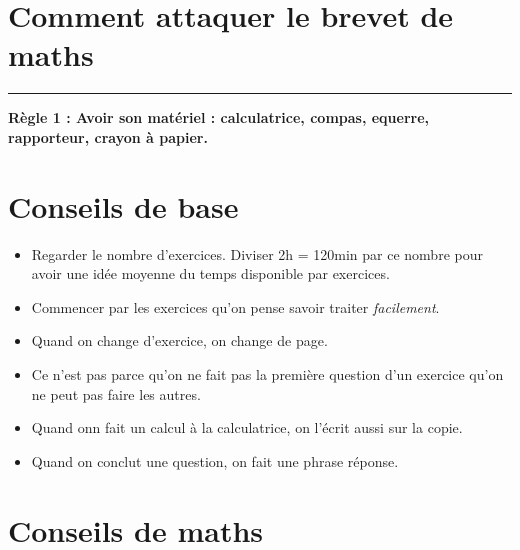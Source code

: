 \documentclass[11pt]{article}
\newcommand{\horrule}[1]{\rule{\linewidth}{#1}} %
\begin{document}

\newtheorem{Definition}{Définition}
\newtheorem{Theorem}{Théorème}
\newtheorem{Proposition}{Propriété}

\renewcommand{\labelitemi}{$\bullet$}
\renewcommand{\labelitemii}{$\circ$}

\setlength{\columnseprule}{0pt}

\section*{Comment attaquer le brevet de maths}
\horrule{2px} 
\textbf{Règle 1 : Avoir son matériel : calculatrice, compas, equerre, rapporteur, crayon à papier.}


\section*{Conseils de base}

\begin{itemize}
\item Regarder le nombre d'exercices. Diviser 2h = 120min par ce nombre pour avoir une idée moyenne du temps disponible par exercices.
\item Commencer par les exercices qu'on pense savoir traiter \textit{facilement}. 
\item Quand on change d'exercice, on change de page.
\item Ce n'est pas parce qu'on ne fait pas la première question d'un exercice qu'on ne peut pas faire les autres.
\item Quand onn fait un calcul à la calculatrice, on l'écrit aussi sur la copie.
\item Quand on conclut une question, on fait une phrase réponse.
\end{itemize}

\section*{Conseils de maths}
\end{document}
